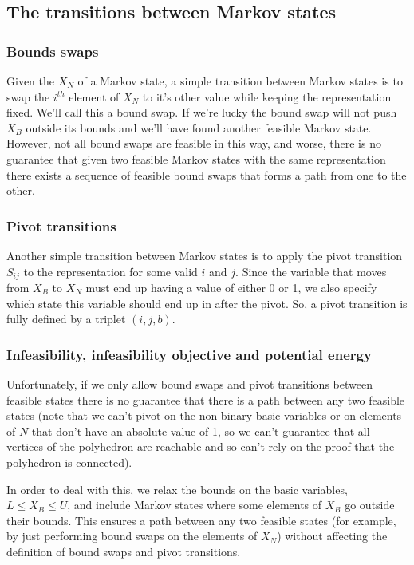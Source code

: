 \documentclass{article}
\begin{document}
\subsection{The transitions between Markov states}

\subsubsection{Bounds swaps}
Given the $X_N$ of a Markov state, a simple transition between Markov states is to swap the $i^{th}$ element of $X_N$ to it's other value while keeping the representation fixed. We'll call this a bound swap. If we're lucky the bound swap will not push $X_B$ outside its bounds and we'll have found another feasible Markov state. However, not all bound swaps are feasible in this way, and worse, there is no guarantee that given two feasible Markov states with the same representation there exists a sequence of feasible bound swaps that forms a path from one to the other.

\subsubsection{Pivot transitions}
Another simple transition between Markov states is to apply the pivot transition $S_{ij}$ to the representation for some valid $i$ and $j$. Since the variable that moves from $X_B$ to $X_N$ must end up having a value of either 0 or 1, we also specify which state this variable should end up in after the pivot. So, a pivot transition is fully defined by a triplet $(i,j,b)$.

\subsubsection{Infeasibility, infeasibility objective and potential energy}

Unfortunately, if we only allow bound swaps and pivot transitions between feasible states there is no guarantee that there is a path between any two feasible states (note that we can't pivot on the non-binary basic variables or on elements of $N$ that don't have an absolute value of 1, so we can't guarantee that all vertices of the polyhedron are reachable and so can't rely on the proof that the polyhedron is connected).

In order to deal with this, we relax the bounds on the basic variables, $L \le X_B \le U$, and include Markov states where some elements of $X_B$ go outside their bounds. This ensures a path between any two feasible states (for example, by just performing bound swaps on the elements of $X_N$) without affecting the definition of bound swaps and pivot transitions.
\end{document}
